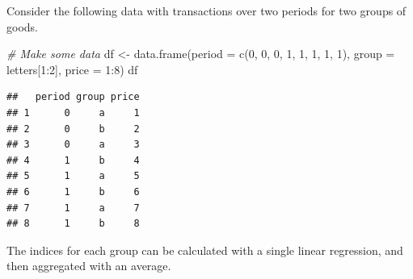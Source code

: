 \documentclass[
]{article}
\newenvironment{Shaded}{\begin{snugshade}}{\end{snugshade}}
\newcommand{\AttributeTok}[1]{\textcolor[rgb]{0.77,0.63,0.00}{#1}}
\newcommand{\CommentTok}[1]{\textcolor[rgb]{0.56,0.35,0.01}{\textit{#1}}}
\newcommand{\DecValTok}[1]{\textcolor[rgb]{0.00,0.00,0.81}{#1}}
\newcommand{\FunctionTok}[1]{\textcolor[rgb]{0.00,0.00,0.00}{#1}}
\newcommand{\NormalTok}[1]{#1}
\newcommand{\OtherTok}[1]{\textcolor[rgb]{0.56,0.35,0.01}{#1}}
\newcommand{\SpecialCharTok}[1]{\textcolor[rgb]{0.00,0.00,0.00}{#1}}
\begin{document}
Consider the following data with transactions over two periods for two groups of goods.

\begin{Shaded}
\begin{Highlighting}[]
\CommentTok{\# Make some data}
\NormalTok{df }\OtherTok{\textless{}{-}} \FunctionTok{data.frame}\NormalTok{(}\AttributeTok{period =} \FunctionTok{c}\NormalTok{(}\DecValTok{0}\NormalTok{, }\DecValTok{0}\NormalTok{, }\DecValTok{0}\NormalTok{, }\DecValTok{1}\NormalTok{, }\DecValTok{1}\NormalTok{, }\DecValTok{1}\NormalTok{, }\DecValTok{1}\NormalTok{, }\DecValTok{1}\NormalTok{), }
                 \AttributeTok{group =}\NormalTok{ letters[}\DecValTok{1}\SpecialCharTok{:}\DecValTok{2}\NormalTok{],}
                 \AttributeTok{price =} \DecValTok{1}\SpecialCharTok{:}\DecValTok{8}\NormalTok{)}
\NormalTok{df}
\end{Highlighting}
\end{Shaded}

\begin{verbatim}
##   period group price
## 1      0     a     1
## 2      0     b     2
## 3      0     a     3
## 4      1     b     4
## 5      1     a     5
## 6      1     b     6
## 7      1     a     7
## 8      1     b     8
\end{verbatim}

The indices for each group can be calculated with a single linear regression, and then aggregated with an average.

\begin{Shaded}
\end{Shaded}
\end{document}
